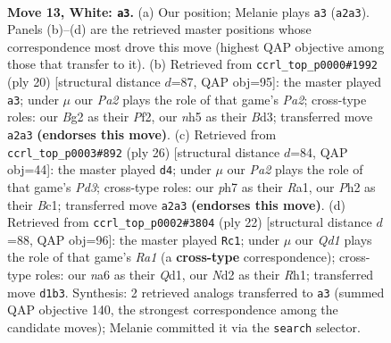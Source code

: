 \documentclass[11pt]{article}
\begin{document}
\clearpage

\begin{figure}[p]\centering
\begin{subfigure}{0.46\textwidth}\centering
\resizebox{\linewidth}{!}{%
\newchessgame
\chessboard[
  setfen={1rbq1rk1/pp5p/n1pb2p1/3p1p1n/3P1P2/5NP1/PP1NP1BP/R1BQR1K1 w - - 3 13},
  showmover=false,
  pgfstyle=straightmove, color=movearrow, markmove={a2-a3}
]}
\caption{}
\end{subfigure}\hfill
\begin{subfigure}{0.46\textwidth}\centering
\resizebox{\linewidth}{!}{%
\newchessgame
\chessboard[
  setfen={r1bq1rk1/1p1nbppp/p1n1p3/3pP3/3P4/3B1N2/PP1N1PPP/R1BQR1K1 w - - 1 11},
  showmover=false,
  pgfstyle=straightmove, color=movearrow, markmove={a2-a3}
]}
\caption{}
\end{subfigure}
\\[4pt]
\begin{subfigure}{0.46\textwidth}\centering
\resizebox{\linewidth}{!}{%
\newchessgame
\chessboard[
  setfen={rq3rk1/2pbbpp1/p2p1n1p/n3p3/p3P3/2PP1N1P/BP1N1PP1/R1BQR1K1 w - - 0 14},
  showmover=false,
  pgfstyle=straightmove, color=movearrow, markmove={d3-d4}
]}
\caption{}
\end{subfigure}\hfill
\begin{subfigure}{0.46\textwidth}\centering
\resizebox{\linewidth}{!}{%
\newchessgame
\chessboard[
  setfen={r1bq1rk1/pp1nbpp1/2n1p3/3pP2p/3P3P/2N1BPP1/PP2N3/R2QKB1R w KQ - 1 12},
  showmover=false,
  pgfstyle=straightmove, color=movearrow, markmove={a1-c1}
]}
\caption{}
\end{subfigure}
\caption{\textbf{Move 13, White: \texttt{a3}.} (a) Our position; Melanie plays \texttt{a3} (\texttt{a2a3}). Panels (b)--(d) are the retrieved master positions whose correspondence most drove this move (highest QAP objective among those that transfer to it). (b) Retrieved from \texttt{ccrl\_top\_p0000\#1992} (ply 20) [structural distance $d$=87, QAP obj=95]: the master played \texttt{a3}; under $\mu$ our \emph{Pa2} plays the role of that game's \emph{Pa2}; cross-type roles: our \emph{B}g2 as their \emph{P}f2, our \emph{n}h5 as their \emph{B}d3; transferred move \texttt{a2a3} \textbf{(endorses this move)}. (c) Retrieved from \texttt{ccrl\_top\_p0003\#892} (ply 26) [structural distance $d$=84, QAP obj=44]: the master played \texttt{d4}; under $\mu$ our \emph{Pa2} plays the role of that game's \emph{Pd3}; cross-type roles: our \emph{p}h7 as their \emph{R}a1, our \emph{P}h2 as their \emph{B}c1; transferred move \texttt{a2a3} \textbf{(endorses this move)}. (d) Retrieved from \texttt{ccrl\_top\_p0002\#3804} (ply 22) [structural distance $d$=88, QAP obj=96]: the master played \texttt{Rc1}; under $\mu$ our \emph{Qd1} plays the role of that game's \emph{Ra1} (a \textbf{cross-type} correspondence); cross-type roles: our \emph{n}a6 as their \emph{Q}d1, our \emph{N}d2 as their \emph{R}h1; transferred move \texttt{d1b3}. Synthesis: 2 retrieved analogs transferred to \texttt{a3} (summed QAP objective 140, the strongest correspondence among the candidate moves); Melanie committed it via the \texttt{search} selector.}
\label{fig:thought-m24}
\end{figure}
\end{document}
